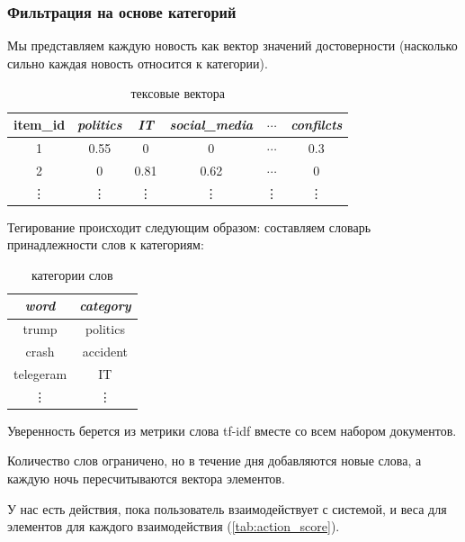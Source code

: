\documentclass[14pt]{matmex-diploma-custom}
\begin{document}
\subsubsection{Фильтрация на основе категорий}
\label{content}

Мы представляем каждую новость как вектор значений достоверности (насколько сильно каждая новость относится к категории).

\begin{table}[h]
    \centering
    \begin{tabular}{cccccc}
        \toprule
        item\_id & \textit{politics} & \textit{IT} & \textit{social\_media} & $\cdots$ & \textit{confilcts} \\
        \midrule
        1 & 0.55 & 0 & 0 & $\cdots$ & 0.3 \\
        2 & 0    & 0.81  & 0.62 & $\cdots$ & 0 \\
        \vdots & \vdots & \vdots & \vdots & \vdots & \vdots\\

        \bottomrule
    \end{tabular}
    \caption{тексовые вектора}
    \label{tab:text_vectors}
\end{table}


Тегирование происходит следующим образом: составляем словарь принадлежности слов к категориям:

\begin{table}[h]
    \centering
    \begin{tabular}{cc}
        \toprule
        \textit{word} & \textit{category} \\
        \midrule
        trump & politics \\
        crash & accident \\
        telegeram & IT \\
        \vdots & \vdots \\
        \bottomrule
    \end{tabular}%
    \caption{категории слов}
    \label{tab:words_categories}
\end{table}

Уверенность берется из метрики слова tf-idf вместе со всем набором документов.

Количество слов ограничено, но в течение дня добавляются новые слова, а каждую ночь пересчитываются вектора элементов.

У нас есть действия, пока пользователь взаимодействует с системой, и веса для элементов для каждого взаимодействия (\cref {tab:action_score}).
\end{document}
